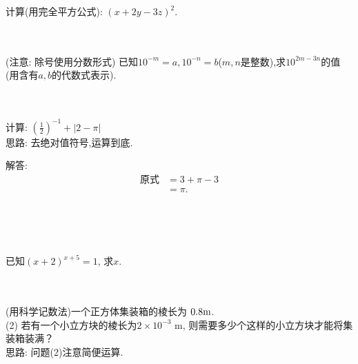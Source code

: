 \item{
    计算(用完全平方公式): $(x+2y-3z)^2$.
}
\\ \\ \\

\item{
    (注意: 除号使用分数形式) 已知$10^{-m}=a, 10^{-n}=b$($m, n$是整数),求$10^{2m-3n}$的值(用含有$a, b$的代数式表示).
}
\\ \\ \\

\begin{comment}
\item{
    已知$2^x=3, 2^y=6, 2^z=12$,判断下列有关$x, y, z$的数量关系式的对错.\\
    (1) $x+z=2y$\\
    (2) $x+y+3=2z$\\
    (3) $4x=z$\\
    (4) $x+1=y$
}
\\ \\
\end{comment}

\item{
    计算: $ (\frac{1}{2})^{-1} + \lvert 2-\pi \rvert $
    \ifshowSolution
    \fangsong{}
    \\
    思路: 去绝对值符号,运算到底.

    解答: 
    \begin{align*}
        \mbox{原式} &= 3 + \pi - 3\\
        &= \pi.
    \end{align*}
    \fi
}
\\ \\ \\

\item{
    已知$(x+2)^{x+5}=1$, 求$x$.
}
\\ \\ \\

\item{
    (用科学记数法)一个正方体集装箱的棱长为 $0.8 \rm{m}$.\\
    (2) 若有一个小立方块的棱长为$2\times 10^{-3} $ m, 则需要多少个这样的小立方块才能将集装箱装满？
    \ifshowSolution
    \fangsong{}
    \\
    思路: 问题(2)注意简便运算.
    \fi
}
\\ \\ \\